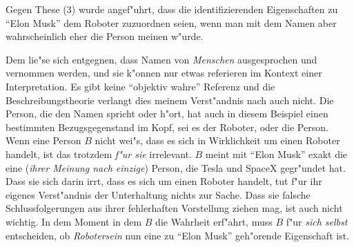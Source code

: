 \documentclass[a4paper, emulatestandardclasses, 12pt]{scrartcl}
\begin{document}
\begin{onehalfspace}
Gegen These (3) wurde angef"uhrt, dass die identifizierenden Eigenschaften zu "`Elon Musk"' dem Roboter zuzuordnen seien, wenn man mit dem Namen aber wahrscheinlich eher die Person meinen w"urde.  

Dem lie"se sich entgegnen, dass Namen von \emph{Menschen} ausgesprochen und vernommen werden, und sie k"onnen nur etwas referieren im Kontext einer Interpretation. Es gibt keine "`objektiv wahre"' Referenz und die Beschreibungstheorie verlangt dies meinem Verst"andnis nach auch nicht. Die Person, die den Namen spricht oder h"ort, hat auch in diesem Beispiel einen bestimmten Bezugsgegenstand im Kopf, sei es der Roboter, oder die Person. Wenn eine Person $B$ nicht wei"s, dass es sich in Wirklichkeit um einen Roboter handelt, ist das trotzdem \emph{f"ur sie} irrelevant. $B$ meint mit "`Elon Musk"' exakt die eine (\emph{ihrer Meinung nach einzige}) Person, die Tesla und SpaceX gegr"undet hat. Dass sie sich darin irrt, dass es sich um einen Roboter handelt, tut f"ur ihr eigenes Verst"andnis der Unterhaltung nichts zur Sache. Dass sie falsche Schlussfolgerungen aus ihrer fehlerhaften Vorstellung ziehen mag, ist auch nicht wichtig. In dem Moment in dem $B$ die Wahrheit erf"ahrt, muss $B$ f"ur \emph{sich selbst} entscheiden, ob \emph{Robotersein} nun eine zu "`Elon Musk"' geh"orende Eigenschaft ist.


\end{onehalfspace}


\end{document}
